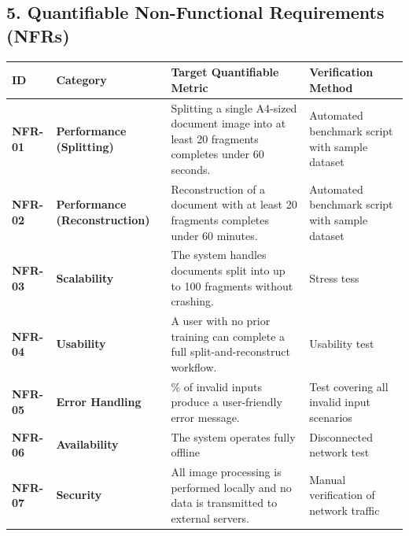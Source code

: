 \documentclass[
]{article}
\newcounter{none} %
\begin{document}
\subsection{5. Quantifiable Non-Functional Requirements
(NFRs)}\label{quantifiable-non-functional-requirements-nfrs}

{\def\LTcaptype{none} %
\begin{longtable}[]{@{}
  >{\raggedright\arraybackslash}p{}
  >{\raggedright\arraybackslash}p{}
  >{\raggedright\arraybackslash}p{}
  >{\raggedright\arraybackslash}p{}@{}}
\toprule\noalign{}
\begin{minipage}[b]{\linewidth}\raggedright
ID
\end{minipage} & \begin{minipage}[b]{\linewidth}\raggedright
Category
\end{minipage} & \begin{minipage}[b]{\linewidth}\raggedright
Target Quantifiable Metric
\end{minipage} & \begin{minipage}[b]{\linewidth}\raggedright
Verification Method
\end{minipage} \\
\midrule\noalign{}
\endhead
\bottomrule\noalign{}
\endlastfoot
\textbf{NFR-01} & \textbf{Performance (Splitting)} & Splitting a single
A4-sized document image into at least 20 fragments completes under 60
seconds. & Automated benchmark script with sample dataset \\
\textbf{NFR-02} & \textbf{Performance (Reconstruction)} & Reconstruction
of a document with at least 20 fragments completes under 60 minutes. &
Automated benchmark script with sample dataset \\
\textbf{NFR-03} & \textbf{Scalability} & The system handles documents
split into up to 100 fragments without crashing. & Stress tess \\
\textbf{NFR-04} & \textbf{Usability} & A user with no prior training can
complete a full split-and-reconstruct workflow. & Usability test \\
\textbf{NFR-05} & \textbf{Error Handling} & 100\% of invalid inputs
produce a user-friendly error message. & Test covering all invalid input
scenarios \\
\textbf{NFR-06} & \textbf{Availability} & The system operates fully
offline & Disconnected network test \\
\textbf{NFR-07} & \textbf{Security} & All image processing is performed
locally and no data is transmitted to external servers. & Manual
verification of network traffic \\
\end{longtable}
}
\end{document}
